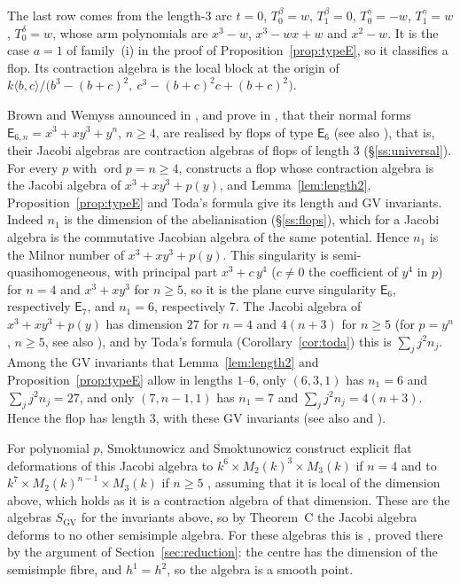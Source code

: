 \documentclass[11pt]{amsart}
\makeatletter
\numberwithin{table}{section}
\numberwithin{figure}{section}
\numberwithin{equation}{section}
\theoremstyle{definition}
\theoremstyle{plain}
\newcommand{\SGV}{S_{\mathrm{GV}}}
\DeclareMathOperator{\ord}{ord}
\renewcommand\paragraph{\@startsection{paragraph}{4}{\z@}{\medskipamount}{-.5em}{\normalfont\bfseries}}
\makeatother
\begin{document}
The last row comes from the length-$3$ arc $t = 0$, $T_0^\beta = w$, $T_1^\beta = 0$, $T_0^\gamma = -w$, $T_1^\gamma = w$, $T_0^\delta = w$, whose arm polynomials are $x^3 - w$, $x^3 - wx + w$ and $x^2 - w$. It is the case $a = 1$ of family~(i) in the proof of Proposition~\ref{prop:typeE}, so it classifies a flop. Its contraction algebra is the local block at the origin of $k\langle b, c\rangle/\bigl(b^3 - (b + c)^2,\ c^3 - (b + c)^2c + (b + c)^2\bigr)$.

\paragraph{The flops $\mathsf{E}_{6,n}$.} Brown and Wemyss announced in \cite[\S1.5, Table~1]{BW}, and prove in \cite[Thms~1.2, 1.3]{BW26}, that their normal forms $\mathsf{E}_{6,n} = x^3 + xy^3 + y^n$, $n \ge 4$, are realised by flops of type $\mathsf{E}_6$ (see also \cite[Thm~1.7]{Wem}), that is, their Jacobi algebras are contraction algebras of flops of length $3$ (\S\ref{ss:universal}). For every $p$ with $\ord p = n \ge 4$, \cite[Cor~4.12]{Pan} constructs a flop whose contraction algebra is the Jacobi algebra of $x^3 + xy^3 + p(y)$, and Lemma~\ref{lem:length2}, Proposition~\ref{prop:typeE} and Toda's formula give its length and GV invariants. Indeed $n_1$ is the dimension of the abelianisation (\S\ref{ss:flops}), which for a Jacobi algebra is the commutative Jacobian algebra of the same potential. Hence $n_1$ is the Milnor number of $x^3 + xy^3 + p(y)$. This singularity is semi-quasihomogeneous, with principal part $x^3 + c\,y^4$ ($c \neq 0$ the coefficient of $y^4$ in $p$) for $n = 4$ and $x^3 + xy^3$ for $n \ge 5$, so it is the plane curve singularity $\mathsf{E}_6$, respectively $\mathsf{E}_7$, and $n_1 = 6$, respectively $7$. The Jacobi algebra of $x^3 + xy^3 + p(y)$ has dimension $27$ for $n = 4$ and $4(n + 3)$ for $n \ge 5$ \cite[Thm~3.1]{Pan} (for $p = y^n$, $n \ge 5$, see also \cite[\S1.3]{BW}), and by Toda's formula (Corollary~\ref{cor:toda}) this is $\sum_j j^2 n_j$. Among the GV invariants that Lemma~\ref{lem:length2} and Proposition~\ref{prop:typeE} allow in lengths $1$--$6$, only $(6, 3, 1)$ has $n_1 = 6$ and $\sum_j j^2 n_j = 27$, and only $(7, n - 1, 1)$ has $n_1 = 7$ and $\sum_j j^2 n_j = 4(n + 3)$. Hence the flop has length $3$, with these GV invariants (see also \cite[Thm~5.3]{Pan} and \cite[Cor~1.6]{BW26}). 

For polynomial $p$, Smoktunowicz and Smoktunowicz construct explicit flat deformations of this Jacobi algebra to $k^6 \times M_2(k)^3 \times M_3(k)$ if $n = 4$ and to $k^7 \times M_2(k)^{n-1} \times M_3(k)$ if $n \ge 5$ \cite[Thms~4.3, 7.1]{SS}, assuming that it is local of the dimension above, which holds as it is a contraction algebra of that dimension. These are the algebras $\SGV$ for the invariants above, so by Theorem~C the Jacobi algebra deforms to no other semisimple algebra. For these algebras this is \cite[Thm~3.1]{Pan}, proved there by the argument of Section~\ref{sec:reduction}: the centre has the dimension of the semisimple fibre, and $h^1 = h^2$, so the algebra is a smooth point.
\end{document}

